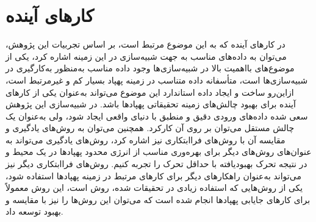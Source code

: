 \section{کارهای آینده}
در کارهای آینده که به این موضوع مرتبط است، بر اساس تجربیات این پژوهش، می‌توان به داده‌های مناسب به جهت شبیه‌سازی در این زمینه اشاره کرد، یکی از موضوع‌های بااهمیت بالا در شبیه‌سازی‌ها وجود داده مناسب به‌منظور به‌کارگیری در شبیه‌سازی‌ها است، متأسفانه داده متناسب در زمینه پهپاد بسیار کم و غیرمرتبط است، ازاین‌رو ساخت و ایجاد داده استاندارد این موضوع می‌تواند به‌عنوان یکی از کارهای آینده برای بهبود چالش‌های زمینه تحقیقاتی پهپادها باشد. در شبیه‌سازی این پژوهش سعی شده داده‌های ورودی دقیق و منطبق با دنیای واقعی ایجاد شود، ولی به‌عنوان یک چالش مستقل می‌توان بر روی آن کارکرد.
همچنین می‌توان به روش‌های یادگیری و مقایسه آن با روش‌های فراابتکاری نیز اشاره کرد، روش‌های یادگیری می‌تواند به عنوان‌های روش‌های دیگر برای بهره‌وری مناسب از انرژی محدود پهپادها در یک محیط و در نتیجه تحرک بهبودیافته با حداقل تحرک را تجربه کنیم. 
روش‌های فراابتکاری دیگر نیز می‌تواند به‌عنوان راهکارهای دیگر برای کارهای مرتبط در زمینه پهپادها استفاده شود، یکی از روش‌هایی که استفاده زیادی در تحقیقات شده، روش  است، این روش معمولاً برای کارهای جایابی پهپادها انجام شده است که می‌توان این روش‌ها را نیز با مقایسه و بهبود توسعه داد.